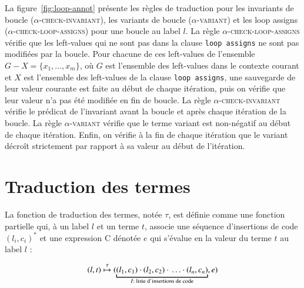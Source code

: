 La figure~\ref{fig:loop-annot} présente les règles de traduction pour les
invariants de boucle (\textsc{$\alpha$-check-invariant}), les variants de boucle
(\textsc{$\alpha$-variant}) et les loop assigns
(\textsc{$\alpha$-check-loop-assigns}) pour une boucle au label $l$.
La règle \textsc{$\alpha$-check-loop-assigns} vérifie que les left-values qui ne
sont pas dans la clause \lstinline'loop assigns' ne sont pas modifiées par la
boucle.
Pour chacune de ces left-values de l'ensemble $G-X = \{x_1, ..., x_m\}$, où $G$
est l'ensemble des left-values dans le contexte courant et $X$ est l'ensemble
des left-values de la clause \lstinline'loop assigns', une sauvegarde de leur
valeur courante est faite au début de chaque itération, puis on vérifie que leur
valeur n'a pas été modifiée en fin de boucle.
La règle \textsc{$\alpha$-check-invariant} vérifie le prédicat de l'invariant
avant la boucle et après chaque itération de la boucle.
La règle \textsc{$\alpha$-variant} vérifie que le terme variant est non-négatif
au début de chaque itération.
Enfin, on vérifie à la fin de chaque itération que le variant décroît
strictement par rapport à sa valeur au début de l'itération.


\section{Traduction des termes \eacsl}
\label{sec:term}


La fonction de traduction des termes, notée $\tau$, est définie comme une
fonction partielle qui, à un label $l$ et un terme $t$, associe une séquence
d'insertions de code $(l_i, c_i)^*$ et une expression C dénotée $e$ qui s'évalue
en la valeur du terme $t$ au label $l$ :

\[
(l, t) \trule
(\underbracket{(l_1, c_1) \concat (l_2, c_2) \concat \ldots
  \concat (l_n, c_n)}_{I : \text{ liste d'insertions de code}}, e)
\]

